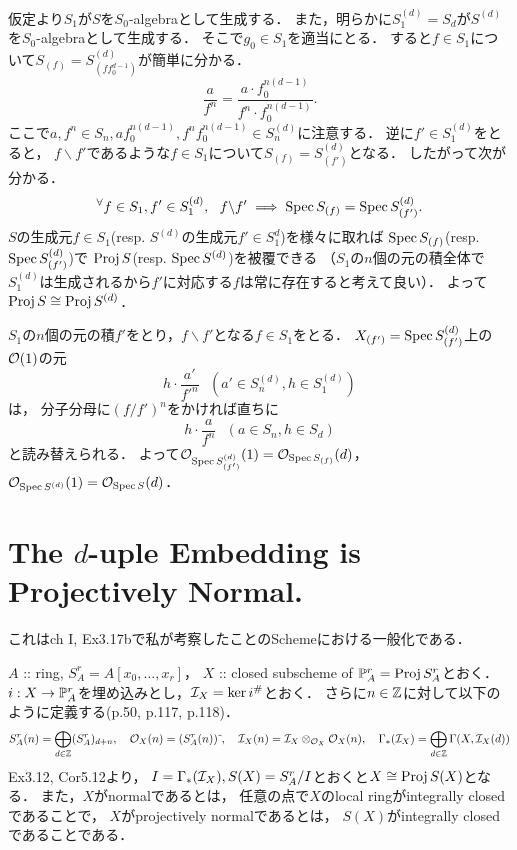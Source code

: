 \documentclass[a4paper]{jsarticle}
\begin{document}
    仮定より$S_{1}$が$S$を$S_0$-algebraとして生成する．
    また，明らかに$S_{1}^{(d)}=S_d$が$S^{(d)}$を$S_0$-algebraとして生成する．
    そこで$g_0 \in S_1$を適当にとる．
    すると$f \in S_1$について$S_{(f)}=S_{(f f_0^{d-1})}^{(d)}$が簡単に分かる．
    \[ \frac{a}{f^n}=\frac{a \cdot f_0^{n(d-1)}}{f^n \cdot f_0^{n(d-1)}}. \]
    ここで$a, f^n \in S_n, a f_0^{n(d-1)}, f^n f_0^{n(d-1)} \in S_n^{(d)}$に注意する．
    逆に$f' \in S_1^{(d)}$をとると，
    $f \backslash f'$であるような$f \in S_1$について$S_{(f)}=S_{(f')}^{(d)}$となる．
    したがって次が分かる．
    \[ {}^{\forall} f \in S_1, f' \in S_1^{(d)},~~ f \backslash f' \implies \operatorname{Spec} S_{(f)}=\operatorname{Spec} S_{(f')}^{(d)}. \]
    $S$の生成元$f \in S_1$(resp. $S^{(d)}$の生成元$f' \in S_1^{d}$)を様々に取れば
    $\operatorname{Spec} S_{(f)}$(resp. $\operatorname{Spec} S_{(f')}^{(d)}$)で
    $\operatorname{Proj} S$(resp. $\operatorname{Spec} S^{(d)}$)を被覆できる
    （$S_1$の$n$個の元の積全体で$S_1^{(d)}$は生成されるから$f'$に対応する$f$は常に存在すると考えて良い）．
    よって$\operatorname{Proj} S \cong \operatorname{Proj} S^{(d)}$．

    $S_1$の$n$個の元の積$f'$をとり，$f \backslash f'$となる$f \in S_1$をとる．
    $X_{(f')}=\operatorname{Spec} S_{(f')}^{(d)}$上の$\mathcal{O}(1)$の元
    \[ h \cdot \frac{a'}{f'^n} ~~~(a' \in S_n^{(d)}, h \in S_1^{(d)}) \]は，
    分子分母に$(f/f')^n$をかければ直ちに
    \[ h \cdot \frac{a}{f^{n}} ~~~ (a \in S_{n}, h \in S_d) \]と読み替えられる．
    よって$\mathcal{O}_{\operatorname{Spec} S_{(f')}^{(d)}}(1)=\mathcal{O}_{\operatorname{Spec} S_{(f)}}(d)$，
    $\mathcal{O}_{\operatorname{Spec} S^{(d)}}(1)=\mathcal{O}_{\operatorname{Spec} S}(d)$．

\section{The $d$-uple Embedding is Projectively Normal.} %
    これはch I, Ex3.17bで私が考察したことのSchemeにおける一般化である．

    $A$ :: ring, $S_A^r=A[x_0,\dots,x_r]$，
    $X$ :: closed subscheme of $\mathbb{P}^r_A=\operatorname{Proj} S_A^r$とおく．
    $i: X \to \mathbb{P}^r_A$を埋め込みとし，$\mathcal{I}_X=\ker i^{\#}$とおく．
    さらに$n \in \mathbb{Z}$に対して以下のように定義する(p.50, p.117, p.118)．
    \[
        S_A^r(n)=\bigoplus_{d \in \mathbb{Z}} (S_A^r)_{d+n},~~~
        \mathcal{O}_X(n)=(S_A^r(n))\,\tilde{}\,,~~~
        \mathcal{I}_X(n)=\mathcal{I}_X \otimes_{\mathcal{O}_X} \mathcal{O}_X(n),~~~
        \Gamma_*(\mathcal{I}_X)=\bigoplus_{d \in \mathbb{Z}} \Gamma(X,\mathcal{I}_X(d))
    \]
    Ex3.12, Cor5.12より，
    $I=\Gamma_*(\mathcal{I}_X), S(X)=S_A^r/I$とおくと$X \cong \operatorname{Proj} S(X)$となる．
    また，$X$がnormalであるとは，
    任意の点で$X$のlocal ringがintegrally closedであることで，
    $X$がprojectively normalであるとは，
    $S(X)$がintegrally closedであることである．
\end{document}
